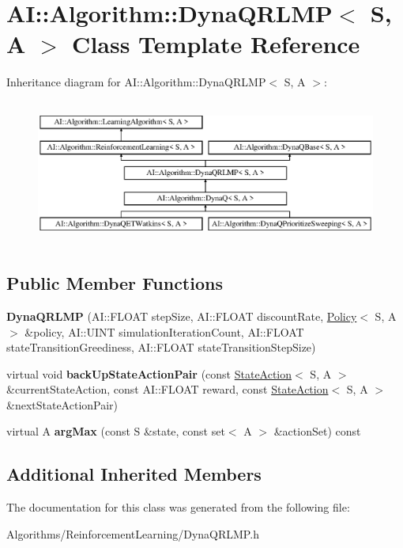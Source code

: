 \hypertarget{classAI_1_1Algorithm_1_1DynaQRLMP}{\section{A\-I\-:\-:Algorithm\-:\-:Dyna\-Q\-R\-L\-M\-P$<$ S, A $>$ Class Template Reference}
\label{classAI_1_1Algorithm_1_1DynaQRLMP}
}
Inheritance diagram for A\-I\-:\-:Algorithm\-:\-:Dyna\-Q\-R\-L\-M\-P$<$ S, A $>$\-:\begin{figure}[H]
\begin{center}
\leavevmode
\includegraphics[height=4.794520cm]{classAI_1_1Algorithm_1_1DynaQRLMP}
\end{center}
\end{figure}
\subsection*{Public Member Functions}
\begin{DoxyCompactItemize}
\item 
\hypertarget{classAI_1_1Algorithm_1_1DynaQRLMP_a83035880e274230c3c50bedeed937550}{{\bfseries Dyna\-Q\-R\-L\-M\-P} (A\-I\-::\-F\-L\-O\-A\-T step\-Size, A\-I\-::\-F\-L\-O\-A\-T discount\-Rate, \hyperlink{classAI_1_1Algorithm_1_1Policy}{Policy}$<$ S, A $>$ \&policy, A\-I\-::\-U\-I\-N\-T simulation\-Iteration\-Count, A\-I\-::\-F\-L\-O\-A\-T state\-Transition\-Greediness, A\-I\-::\-F\-L\-O\-A\-T state\-Transition\-Step\-Size)}\label{classAI_1_1Algorithm_1_1DynaQRLMP_a83035880e274230c3c50bedeed937550}

\item 
\hypertarget{classAI_1_1Algorithm_1_1DynaQRLMP_a7b3b5f3706744290b12c19f786e5e4e4}{virtual void {\bfseries back\-Up\-State\-Action\-Pair} (const \hyperlink{classAI_1_1StateAction}{State\-Action}$<$ S, A $>$ \&current\-State\-Action, const A\-I\-::\-F\-L\-O\-A\-T reward, const \hyperlink{classAI_1_1StateAction}{State\-Action}$<$ S, A $>$ \&next\-State\-Action\-Pair)}\label{classAI_1_1Algorithm_1_1DynaQRLMP_a7b3b5f3706744290b12c19f786e5e4e4}

\item 
\hypertarget{classAI_1_1Algorithm_1_1DynaQRLMP_a57a8d01392c4a3699853f3aa623d9ebf}{virtual A {\bfseries arg\-Max} (const S \&state, const set$<$ A $>$ \&action\-Set) const }\label{classAI_1_1Algorithm_1_1DynaQRLMP_a57a8d01392c4a3699853f3aa623d9ebf}

\end{DoxyCompactItemize}
\subsection*{Additional Inherited Members}


The documentation for this class was generated from the following file\-:\begin{DoxyCompactItemize}
\item 
Algorithms/\-Reinforcement\-Learning/Dyna\-Q\-R\-L\-M\-P.\-h\end{DoxyCompactItemize}

